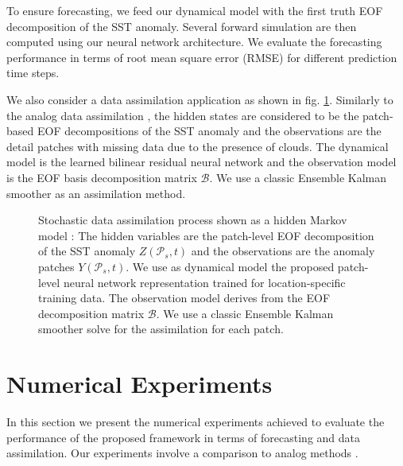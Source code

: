 \documentclass{article}
\def\remRF#1{{\noindent\color{cyan}{{\footnotesize [RF: #1]}}}}
\begin{document}
To ensure forecasting, we feed our dynamical model with the first truth EOF decomposition of the SST anomaly. Several forward simulation are then computed using our neural network architecture. We evaluate the forecasting performance in terms of root mean square error (RMSE) for different prediction time steps.


We also consider a data assimilation application as shown in fig. \ref{fig:HMM_str}. Similarly to the analog data assimilation \cite{fablet_data-driven_2017}, the hidden states are considered to be the patch-based EOF decompositions of the SST anomaly and the observations are the detail patches with missing data due to the presence of clouds. The dynamical model is the learned bilinear residual neural network and the observation model is the EOF basis decomposition matrix $\mathcal{B}$. We use a classic Ensemble Kalman smoother \cite{evensen_data_2009} as an assimilation method.

\begin{figure}[htb]

\begin{minipage}[b]{1.0\linewidth}
  \centering
\centerline{}
\caption{Stochastic data assimilation process shown as a hidden Markov model : The hidden variables are the patch-level EOF decomposition of the SST anomaly $Z(\mathcal{P}_s,t)$ and the observations are the anomaly patches $Y(\mathcal{P}_s,t)$. We use as dynamical model the proposed patch-level neural network representation trained for location-specific training data. The observation model derives from the EOF decomposition matrix $\mathcal{B}$. We use a classic Ensemble Kalman smoother \cite{evensen_data_2009} solve for the assimilation for each patch.}
\label{fig:HMM_str}
\end{minipage}
\end{figure}


\section{Numerical Experiments}
\label{sec:EXP}
In this section we present the numerical experiments achieved to evaluate the  performance of the proposed framework in terms of forecasting and data assimilation. Our experiments involve a comparison to analog methods \cite{lguensat_analog_2017}.
\end{document}
